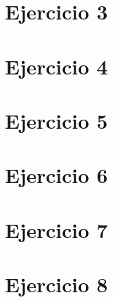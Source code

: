 \documentclass[a4paper]{article}
\begin{document}
\section{Ejercicio 3}

\vspace*{0.3cm}

\vspace*{0.6cm}

\section{Ejercicio 4}

\vspace*{0.3cm}

\vspace*{0.6cm}

\section{Ejercicio 5}

\vspace*{0.3cm}

\vspace*{0.6cm}

\section{Ejercicio 6}

\vspace*{0.3cm}

\vspace*{0.6cm}

\section{Ejercicio 7}

\vspace*{0.3cm}

\vspace*{0.6cm}

\section{Ejercicio 8}

\vspace*{0.3cm}

\vspace*{0.6cm}
\end{document}
